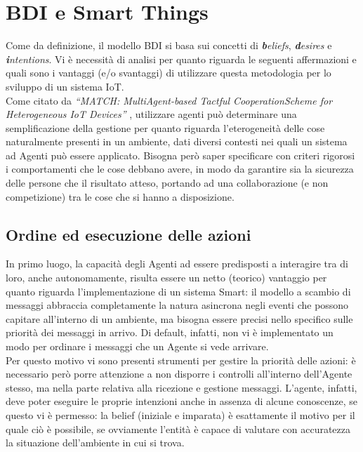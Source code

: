 \documentclass[12pt,a4paper,openright,oneside]{report}
\newcommand{\quotes}[1]{``#1''}
\begin{document}
\section{BDI e Smart Things}
Come da definizione, il modello BDI si basa sui concetti di \textit{\textbf{b}eliefs}, \textit{\textbf{d}esires} e \textit{\textbf{i}ntentions}. Vi è necessità di analisi per quanto riguarda le seguenti affermazioni e quali sono i vantaggi (e/o svantaggi) di utilizzare questa metodologia per lo sviluppo di un sistema IoT.\\

Come citato da \textit{\quotes{MATCH: MultiAgent-based Tactful CooperationScheme for Heterogeneous IoT Devices}} \cite{masiot}, utilizzare agenti può determinare una semplificazione della gestione per quanto riguarda l'eterogeneità delle cose naturalmente presenti in un ambiente, dati diversi contesti nei quali un sistema ad Agenti può essere applicato. Bisogna però saper specificare con criteri rigorosi i comportamenti che le cose debbano avere, in modo da garantire sia la sicurezza delle persone che il risultato atteso, portando ad una collaborazione (e non competizione) tra le cose che si hanno a disposizione.

\subsection{Ordine ed esecuzione delle azioni}
In primo luogo, la capacità degli Agenti ad essere predisposti a interagire tra di loro, anche autonomamente, risulta essere un netto (teorico) vantaggio per quanto riguarda l'implementazione di un sistema Smart: il modello a scambio di messaggi abbraccia completamente la natura asincrona negli eventi che possono capitare all'interno di un ambiente, ma bisogna essere precisi nello specifico sulle priorità dei messaggi in arrivo. Di default, infatti, non vi è implementato un modo per ordinare i messaggi che un Agente si vede arrivare.\\

Per questo motivo vi sono presenti strumenti per gestire la priorità delle azioni: è necessario però porre attenzione a non disporre i controlli all'interno dell'Agente stesso, ma nella parte relativa alla ricezione e gestione messaggi. L'agente, infatti, deve poter eseguire le proprie intenzioni anche in assenza di alcune conoscenze, se questo vi è permesso: la belief (iniziale e imparata) è esattamente il motivo per il quale ciò è possibile, se ovviamente l'entità è capace di valutare con accuratezza la situazione dell'ambiente in cui si trova.\\
\end{document}

